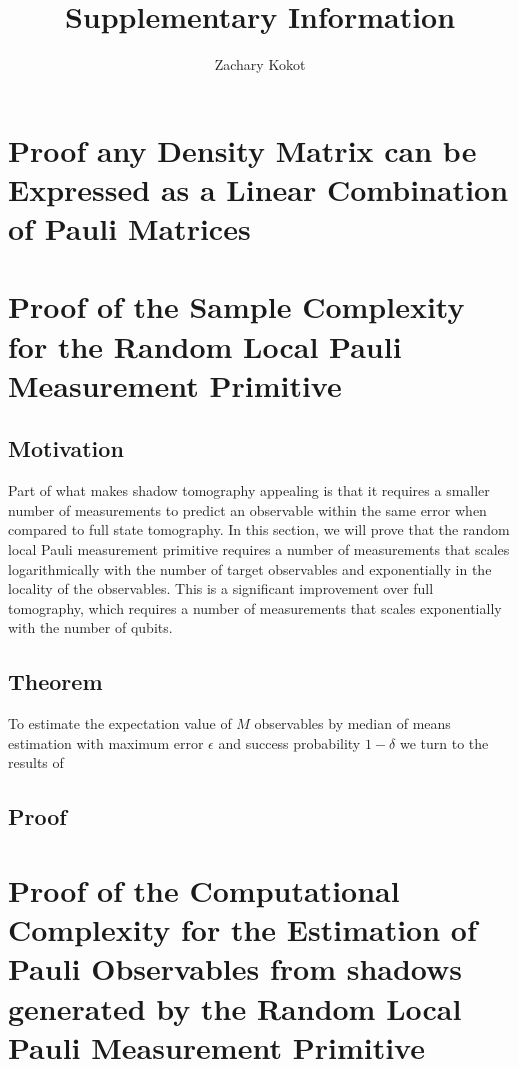 \documentclass[12pt]{article}
\author{Zachary Kokot}
\title{Supplementary Information}
\begin{document}
    \maketitle

    \tableofcontents

    \newpage

    \section{Proof any Density Matrix can be Expressed as a Linear Combination of Pauli Matrices}

    \section{Proof of the Sample Complexity for the Random Local Pauli Measurement Primitive}

    \subsection{Motivation}
    Part of what makes shadow tomography appealing is that it requires a smaller number of measurements to predict an observable within the same error when compared to full state tomography. In this section, we will prove that the random local Pauli measurement primitive requires a number of measurements that scales logarithmically with the number of target observables and exponentially in the locality of the observables. This is a significant improvement over full tomography, which requires a number of measurements that scales exponentially with the number of qubits.

    \subsection{Theorem}
    To estimate the expectation value of $M$ observables by median of means estimation with maximum error $\epsilon$ and success probability $1-\delta$ we turn to the results of \cite{Huang_Kueng_Preskill_2020}

    \subsection{Proof}

    \section{Proof of the Computational Complexity for the Estimation of Pauli Observables from shadows generated by the Random Local Pauli Measurement Primitive}
\end{document}
